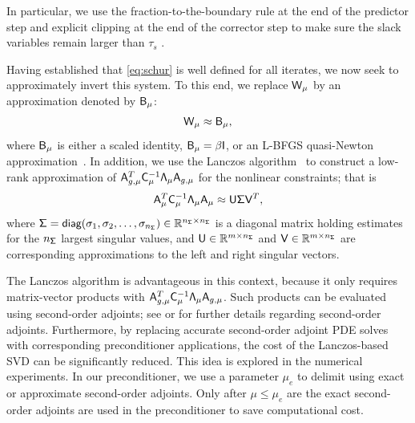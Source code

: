 In particular, we use the fraction-to-the-boundary rule 
at the end of the predictor step and explicit clipping at the end of the corrector step to make sure 
the slack variables remain larger than $\tau_s$ . 


Having established that \eqref{eq:schur} is well defined for all iterates, we
now seek to approximately invert this system.  To this end, we replace
$\mathsf{W}_{\mu}$ by an approximation denoted by $\mathsf{B}_{\mu}$:
\begin{equation*}
\mathsf{W}_{\mu} \approx \mathsf{B}_{\mu},
\end{equation*}
where $\mathsf{B}_{\mu}$ is either a scaled identity, $\mathsf{B}_{\mu} = \beta
\mathsf{I}$, or an L-BFGS quasi-Newton approximation~\cite{liu:1989}.  In addition,
we use the Lanczos algorithm~\cite{saad:1992} to construct a low-rank
approximation of $\mathsf{A}_{g,\mu}^T \mathsf{C}_\mu^{-1} \mathsf{\Lambda}_\mu
\mathsf{A}_{g,\mu}$ for the nonlinear constraints; that is
\begin{equation}\label{eq:svd}
  \mathsf{A}_\mu^T  \mathsf{C}_\mu^{-1}  \mathsf{\Lambda}_{\mu}\mathsf{A}_\mu
  \approx \mathsf{U} \mathsf{\Sigma} \mathsf{V}^T,
\end{equation}
where $\mathsf{\Sigma} = \textsf{diag}(\sigma_1,\sigma_2,\ldots,\sigma_{n_{\mathsf{\Sigma}}}) \in
\mathbb{R}^{n_{\mathsf{\Sigma}}\times n_{\mathsf{\Sigma}}}$ is a diagonal matrix holding estimates for the
$n_{\mathsf{\Sigma}}$ largest singular values, and $\mathsf{U} \in \mathbb{R}^{m\times n_{\mathsf{\Sigma}}}$ and
$\mathsf{V} \in \mathbb{R}^{m\times n_{\mathsf{\Sigma}}}$ are corresponding approximations to the
left and right singular vectors. 

\begin{remark}
  The Lanczos algorithm is advantageous in this context, because it only
  requires matrix-vector products with $\mathsf{A}_{g,\mu}^T \mathsf{C}_\mu^{-1}
  \mathsf{\Lambda}_\mu \mathsf{A}_{g,\mu}$.  Such products can be evaluated using
  second-order adjoints; see \cite{hicken:inexact2014} or
  \cite{dener:scitech2015} for further details regarding second-order adjoints.
  Furthermore, by replacing accurate second-order adjoint PDE solves with
  corresponding preconditioner applications, the cost of the Lanczos-based SVD
  can be significantly reduced.  This idea is explored in the numerical
  experiments.  In our preconditioner, we use a parameter $\mu_e$ 
   to delimit using exact or approximate second-order adjoints. Only after 
   $\mu \leq \mu_e $ are the exact second-order adjoints are used in the preconditioner 
   to save computational cost. 
\end{remark}

